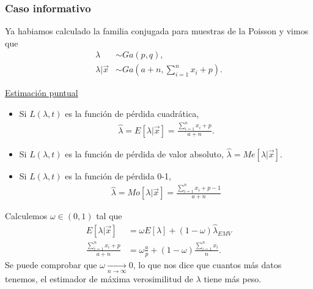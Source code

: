 \subsubsection{Caso informativo}
Ya habiamos calculado la familia conjugada para muestras de la Poisson y vimos que
\begin{align*}
    \lambda           & \sim Ga(p,q),                                       \\
    \lambda | \vec{x} & \sim Ga\left( a+ n, \sum_{i=1}^{n} x_i + p \right).
\end{align*}

\underline{Estimación puntual}
\begin{itemize}
    \item Si $L(\lambda,t)$ es la función de pérdida cuadrática,
          \begin{align*}
              \widehat{\lambda} = E[\lambda |  \vec{x}] = \frac{\sum_{i=1}^{n} x_i + p}{a+n}.
          \end{align*}
    \item Si $L(\lambda,t)$ es la función de pérdida de valor absoluto, $\widehat{\lambda} = Me[\lambda | \vec{x}]$.
    \item Si $L(\lambda,t)$ es la función de pérdida 0-1,
          \begin{align*}
              \widehat{\lambda} = Mo[\lambda | \vec{x}] =  \frac{\sum_{i=1}^{n} x_i + p-1}{a+n}
          \end{align*}
\end{itemize}
Calculemos $\omega \in (0,1)$ tal que
\begin{align*}
    E[\lambda  | \vec{x}]              & = \omega E[\lambda]  + (1 - \omega) \widehat{\lambda }_{EMV}    \\
    \frac{\sum_{i=1}^{n} x_i + p}{a+n} & = \omega \frac{a}{p} + (1-\omega) \frac{\sum_{i=1}^{n} x_i}{n}.
\end{align*}
Se puede comprobar que $\omega \xrightarrow[n \to \infty]{} 0$, lo que nos dice que cuantos más datos tenemos, el estimador de máxima verosimilitud de $\lambda$ tiene más peso.

